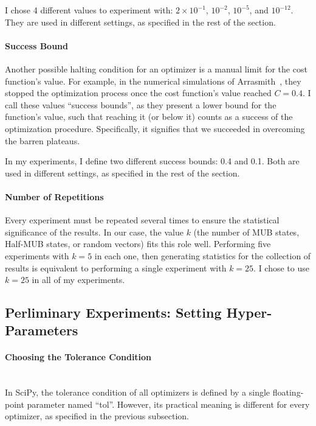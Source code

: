 \documentclass[a4paper,12pt]{article}
\newcommand{\e}[1]{ 10^{#1}}
\begin{document}
I chose 4 different values to experiment with: $2 \times \e{-1}$, $\e{-2}$, $\e{-5}$, and $\e{-12}$. They are used in different settings, as specified in the rest of the section.

\paragraph*{Success Bound}
Another possible halting condition for an optimizer is a manual limit for the cost function's value.
For example, in the numerical simulations of Arrasmith~\cite{arrasmith_effect_2021}, they stopped the optimization process once the cost function's value reached $C=0.4$.
I call these values ``success bounds'', as they present a lower bound for the function's value, such that reaching it (or below it) counts as a success of the optimization procedure. Specifically, it signifies that we succeeded in overcoming the barren plateaus.

In my experiments, I define two different success bounds: 0.4 and 0.1.
Both are used in different settings, as specified in the rest of the section.

\paragraph*{Number of Repetitions}
Every experiment must be repeated several times to ensure the statistical significance of the results. In our case, the value $k$ (the number of MUB states, Half-MUB states, or random vectors) fits this role well.
Performing five experiments with $k=5$ in each one, then generating statistics for the collection of results is equivalent to performing a single experiment with $k=25$.
I chose to use $k=25$ in all of my experiments.

\subsection{Perliminary Experiments: Setting Hyper-Parameters} \label{subsec:exp_hyperparams}

\paragraph*{Choosing the Tolerance Condition}~\\
In SciPy, the tolerance condition of all optimizers is defined by a single floating-point parameter named ``tol''. However, its practical meaning is different for every optimizer, as specified in the previous subsection.
\end{document}
